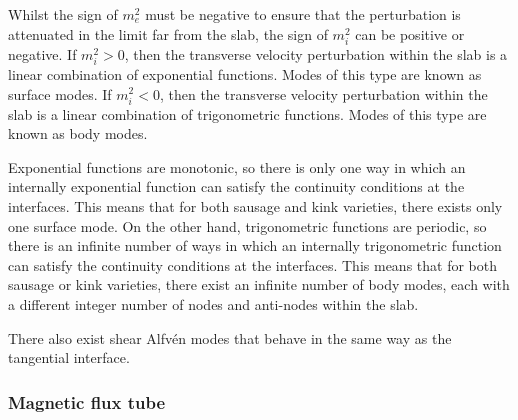\documentclass[12pt]{../style-files/ociamthesis}
\begin{document}
Whilst the sign of $m_e^2$ must be negative to ensure that the perturbation is attenuated in the limit far from the slab, the sign of $m_i^2$ can be positive or negative. If $m_i^2 > 0$, then the transverse velocity perturbation within the slab is a linear combination of exponential functions. Modes of this type are known as surface modes. If $m_i^2 < 0$, then the transverse velocity perturbation within the slab is a linear combination of trigonometric functions. Modes of this type are known as body modes.

Exponential functions are monotonic, so there is only one way in which an internally exponential function can satisfy the continuity conditions at the interfaces. This means that for both sausage and kink varieties, there exists only one surface mode. On the other hand, trigonometric functions are periodic, so there is an infinite number of ways in which an internally trigonometric function can satisfy the continuity conditions at the interfaces. This means that for both sausage or kink varieties, there exist an infinite number of body modes, each with a different integer number of nodes and anti-nodes within the slab.

There also exist shear Alfv\'{e}n modes that behave in the same way as the tangential interface.


\subsubsection{Magnetic flux tube} \label{sec: MHD waves tube}
\end{document}
